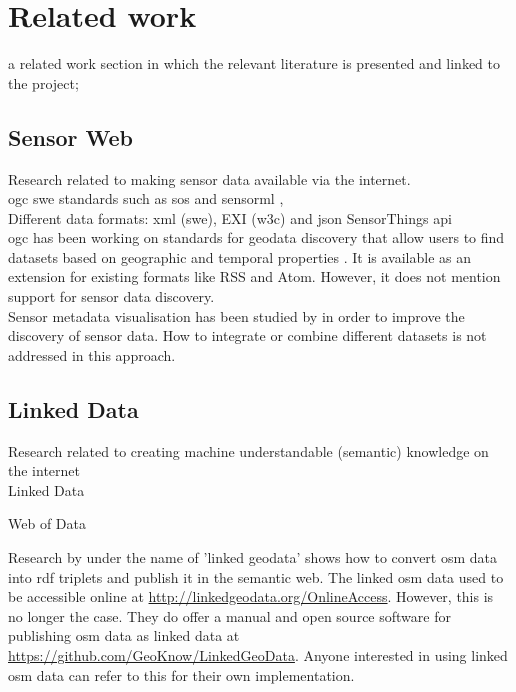 \chapter{Related work}
\label{chap:rw}

a related work section in which the relevant literature is presented and linked to the project;


\section{Sensor Web}
Research related to making sensor data available via the internet. \\

\ac{ogc} \ac{swe} standards such as \ac{sos} and \ac{sensorml} \citep{SW:OGC}, \citep{SW:Botts} \\

Different data formats: \ac{xml} (\ac{swe}), EXI (\ac{w3c}) and \ac{json} SensorThings \ac{api} \citep{IOT:Zanelli} \\

\ac{ogc} has been working on standards for geodata discovery that allow users to find datasets based on geographic and temporal properties \citep{SW:OGC2}. It is available as an extension for existing formats like RSS and Atom. However, it does not mention support for sensor data discovery. \\

Sensor metadata visualisation has been studied by \cite{SW:Yoo} in order to improve the discovery of sensor data. How to integrate or combine different datasets is not addressed in this approach. 


\section{Linked Data}
Research related to creating machine understandable (semantic) knowledge on the internet \\

Linked Data \citep{LD:Berners-lee}

Web of Data \cite{LD:Bizer} 

Research by \cite{LD:Auer} under the name of 'linked geodata' shows how to convert \ac{osm} data into \ac{rdf} triplets and publish it in the semantic web. The linked \ac{osm} data used to be accessible online at \url{http://linkedgeodata.org/OnlineAccess}. However, this is no longer the case. They do offer a manual and open source software for publishing \ac{osm} data as linked data at \url{https://github.com/GeoKnow/LinkedGeoData}. Anyone interested in using linked \ac{osm} data can refer to this for their own implementation.     

